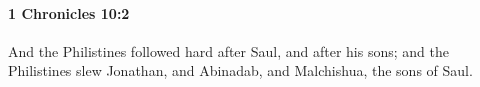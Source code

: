 
		\paragraph{1 Chronicles 10:2} %
			\label{1CHRONICLES-10-2}

			And the Philistines followed hard after Saul, and after his sons; and the Philistines slew Jonathan, and Abinadab, and Malchishua, the sons of Saul.


